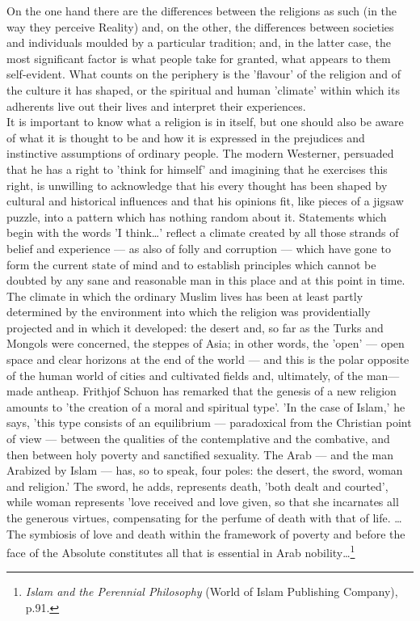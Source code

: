 \documentclass[11pt, b5paper, twoside]{book}
\begin{document}
On the one hand there are the differences between the religions as such (in the way they perceive Reality) and, on the other, the differences between societies and individuals moulded by a particular tradition; and, in the latter case, the most significant factor is what people take for granted, what appears to them self-evident. What counts on the periphery is the 'flavour' of the religion and of the culture it has shaped, or the spiritual and human 'climate' within which its adherents live out their lives and interpret their experiences. \\

It is important to know what a religion is in itself, but one should also be aware of what it is thought to be and how it is expressed in the prejudices and instinctive assumptions of ordinary people. The modern Westerner, persuaded that he has a right to 'think for himself' and imagining that he exercises this right, is unwilling to acknowledge that his every thought has been shaped by cultural and historical influences and that his opinions fit, like pieces of a jigsaw puzzle, into a pattern which has nothing random about it. Statements which begin with the words 'I think\ldots{}' reflect a climate created by all those strands of belief and experience --- as also of folly and corruption --- which have gone to form the current state of mind and to establish principles which cannot be doubted by any sane and reasonable man in this place and at this point in time. \\

The climate in which the ordinary Muslim lives has been at least partly determined by the environment into which the religion was providentially projected and in which it developed: the desert and, so far as the Turks and Mongols were concerned, the steppes of Asia; in other words, the 'open' --- open space and clear horizons at the end of the world --- and this is the polar opposite of the human world of cities and cultivated fields and, ultimately, of the man---made antheap. Frithjof Schuon has remarked that the genesis of a new religion amounts to 'the creation of a moral and spiritual type'. 'In the case of Islam,' he says, 'this type consists of an equilibrium --- paradoxical from the Christian point of view --- between the qualities of the contemplative and the combative, and then between holy poverty and sanctified sexuality. The Arab --- and the man Arabized by Islam --- has, so to speak, four poles: the desert, the sword, woman and religion.' The sword, he adds, represents death, 'both dealt and courted', while woman represents 'love received and love given, so that she incarnates all the generous virtues, compensating for the perfume of death with that of life. \ldots{} The symbiosis of love and death within the framework of poverty and before the face of the Absolute constitutes all that is essential in Arab nobility\ldots{}\footnote{\emph{Islam and the Perennial Philosophy} (World of Islam Publishing Company), p.91.}\\
\end{document}
